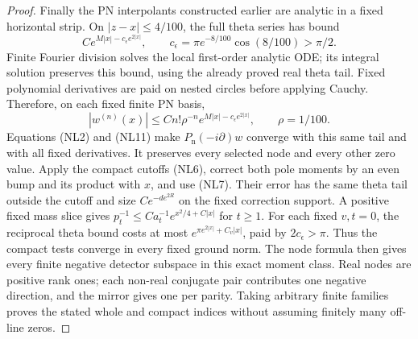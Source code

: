 \documentclass[11pt]{article}
\theoremstyle{remark}\newtheorem{remark}[theorem]{Remark}
\begin{document}
\begin{proof}
Finally the PN interpolants constructed earlier are analytic in
a fixed horizontal strip. On \(|z-x|\le4/100\), the full theta
series has bound
\[
 Ce^{M|x|-c_\epsilon e^{2|x|}},\qquad
 c_\epsilon=\pi e^{-8/100}\cos(8/100)>\pi/2 .
\]
Finite Fourier division solves the local first-order analytic ODE;
its integral solution preserves this bound, using the already
proved real theta tail. Fixed polynomial derivatives are paid on
nested circles before applying Cauchy. Therefore, on each fixed
finite PN basis,
\[
 |w^{(n)}(x)|\le Cn!\rho^{-n}
                      e^{M|x|-c_\epsilon e^{2|x|}},\qquad
                         \rho=1/100.                          \tag{NL11}
\]
Equations (NL2) and (NL11) make \(P_{\mathrm n}(-i\partial)w\)
converge with this same tail and with all fixed derivatives.
It preserves every selected node and every other zero value.
Apply the compact cutoffs (NL6), correct both pole moments by
an even bump and its product with \(x\), and use (NL7).
Their error has the same theta tail outside the cutoff and
size \(Ce^{-d e^{2R}}\) on the fixed correction support.
A positive fixed mass slice gives
\(p_t^{-1}\le Ca_t^{-1}e^{x^2/4+C|x|}\) for \(t\ge1\).
For each fixed \(v,t=0\), the reciprocal theta bound costs
at most \(e^{\pi e^{2|x|}+C_v|x|}\), paid by \(2c_\epsilon>\pi\).
Thus the compact tests converge in every fixed ground norm.
The node formula then gives every finite negative detector
subspace in this exact moment class. Real nodes are positive
rank ones; each non-real conjugate pair contributes one
negative direction, and the mirror gives one per parity.
Taking arbitrary finite families proves the stated whole
and compact indices without assuming finitely many off-line zeros.
\end{proof}
\end{document}
